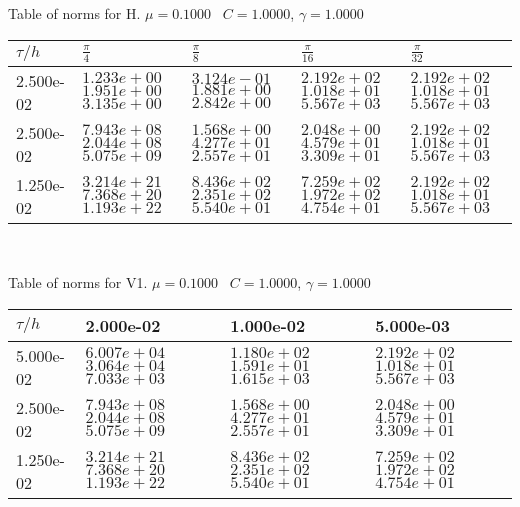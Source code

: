 

\newpage



\newpage



\newpage




\begin{center}
	Table of norms for H. $\mu = 0.1000$ \, $C = 1.0000$, $\gamma = 1.0000$
	
	\begin{tabular}{|p{1in}|p{1in}|p{1in}|p{1in}| p{1in}|} \hline
		$\tau / h$& $\frac{\pi}{4}$ &$\frac{\pi}{8}$ &$\frac{\pi}{16}$ &$\frac{\pi}{32}$ \\ \hline 
		2.500e-02 & $1.233e+00$  $1.951e+00$  $3.135e+00$  & $3.124e-01$  $1.881e+00$  $2.842e+00$  & $2.192e+02$  $1.018e+01$  $5.567e+03$ & $2.192e+02$  $1.018e+01$  $5.567e+03$ \\ \hline 
		2.500e-02 & $7.943e+08$  $2.044e+08$  $5.075e+09$  & $1.568e+00$  $4.277e+01$  $2.557e+01$  & $2.048e+00$  $4.579e+01$  $3.309e+01$ & $2.192e+02$  $1.018e+01$  $5.567e+03$\\ \hline 
		1.250e-02 & $3.214e+21$  $7.368e+20$  $1.193e+22$  & $8.436e+02$  $2.351e+02$  $5.540e+01$  & $7.259e+02$  $1.972e+02$  $4.754e+01$ & $2.192e+02$  $1.018e+01$  $5.567e+03$\\ \hline 
		
	\end{tabular}\\[20pt]
\end{center}

\begin{center}
	Table of norms for V1. $\mu = 0.1000$ \, $C = 1.0000$, $\gamma = 1.0000$
	
	\begin{tabular}{|p{1in}|p{1in}|p{1in}|p{1in}|} \hline
		$\tau / h$ &2.000e-02 &1.000e-02 &5.000e-03 \\ \hline 
		5.000e-02 & $6.007e+04$  $3.064e+04$  $7.033e+03$  & $1.180e+02$  $1.591e+01$  $1.615e+03$  & $2.192e+02$  $1.018e+01$  $5.567e+03$ \\ \hline 
		2.500e-02 & $7.943e+08$  $2.044e+08$  $5.075e+09$  & $1.568e+00$  $4.277e+01$  $2.557e+01$  & $2.048e+00$  $4.579e+01$  $3.309e+01$ \\ \hline 
		1.250e-02 & $3.214e+21$  $7.368e+20$  $1.193e+22$  & $8.436e+02$  $2.351e+02$  $5.540e+01$  & $7.259e+02$  $1.972e+02$  $4.754e+01$ \\ \hline 
		
	\end{tabular}\\[20pt]
\end{center}

